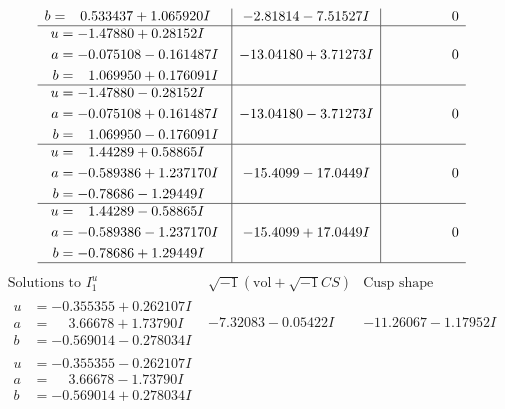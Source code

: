 \documentclass[1p]{elsarticle_modified}
\theoremstyle{definition}
\newcommand{\I}{\sqrt{-1}}
\begin{document}
$$\begin{array}{c|c|c}
\begin{aligned}
b &= \phantom{-}0.533437 + 1.065920 I\end{aligned}
 & -2.81814 - 7.51527 I & \phantom{-0.000000 } 0 \\ \hline\begin{aligned}
u &= -1.47880 + 0.28152 I \\
a &= -0.075108 - 0.161487 I \\
b &= \phantom{-}1.069950 + 0.176091 I\end{aligned}
 & -13.04180 + 3.71273 I & \phantom{-0.000000 } 0 \\ \hline\begin{aligned}
u &= -1.47880 - 0.28152 I \\
a &= -0.075108 + 0.161487 I \\
b &= \phantom{-}1.069950 - 0.176091 I\end{aligned}
 & -13.04180 - 3.71273 I & \phantom{-0.000000 } 0 \\ \hline\begin{aligned}
u &= \phantom{-}1.44289 + 0.58865 I \\
a &= -0.589386 + 1.237170 I \\
b &= -0.78686 - 1.29449 I\end{aligned}
 & -15.4099 - 17.0449 I & \phantom{-0.000000 } 0 \\ \hline\begin{aligned}
u &= \phantom{-}1.44289 - 0.58865 I \\
a &= -0.589386 - 1.237170 I \\
b &= -0.78686 + 1.29449 I\end{aligned}
 & -15.4099 + 17.0449 I & \phantom{-0.000000 } 0\\
 \hline 
 \end{array}$$\newpage$$\begin{array}{c|c|c}  
\text{Solutions to }I^u_{1}& \I (\text{vol} + \sqrt{-1}CS) & \text{Cusp shape}\\
 \hline 
\begin{aligned}
u &= -0.355355 + 0.262107 I \\
a &= \phantom{-}3.66678 + 1.73790 I \\
b &= -0.569014 - 0.278034 I\end{aligned}
 & -7.32083 - 0.05422 I & -11.26067 - 1.17952 I \\ \hline\begin{aligned}
u &= -0.355355 - 0.262107 I \\
a &= \phantom{-}3.66678 - 1.73790 I \\
b &= -0.569014 + 0.278034 I\end{aligned}

\end{array}$$
\end{document}
